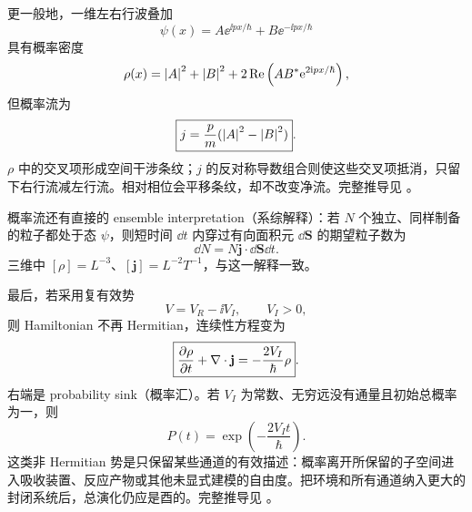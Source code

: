 
更一般地，一维左右行波叠加
\begin{equation}
  \psi(x)=A\ee^{\ii px/\hbar}+B\ee^{-\ii px/\hbar}
  \label{eq:QM-C05-S03-counterpropagating-state}
\end{equation}
具有概率密度
\begin{equation}
  \rho(x)=\left|A\right|^2+\left|B\right|^2
  +2\operatorname{Re}
  \left(AB^*\mathrm{e}^{2\mathrm{i} px/\hbar}\right),
  \label{eq:QM-C05-S03-counterpropagating-density}
\end{equation}
但概率流为
\begin{equation}
  \boxed{j=\frac{p}{m}(\left|A\right|^2-\left|B\right|^2)}.
  \label{eq:QM-C05-S03-counterpropagating-current}
\end{equation}
$\rho$ 中的交叉项形成空间干涉条纹；$j$ 的反对称导数组合则使这些交叉项抵消，只留下右行流减左行流。相对相位会平移条纹，却不改变净流。完整推导见
。

概率流还有直接的 ensemble interpretation（系综解释）：若 $N$ 个独立、同样制备的粒子都处于态 $\psi$，则短时间 $\dd t$ 内穿过有向面积元 $\dd\mathbf S$ 的期望粒子数为
\begin{equation}
  \dd N=N\mathbf j\cdot\dd\mathbf S\dd t.
  \label{eq:QM-C05-S03-ensemble-flux}
\end{equation}
三维中 $[\rho]=L^{-3}$、$[\mathbf j]=L^{-2}T^{-1}$，与这一解释一致。

最后，若采用复有效势
\begin{equation}
  V=V_R-\ii V_I,
  \qquad V_I>0,
  \label{eq:QM-C05-S03-complex-potential}
\end{equation}
则 Hamiltonian 不再 Hermitian，连续性方程变为
\begin{equation}
  \boxed{
  \frac{\partial \rho}{\partial t}+\nabla\cdot\mathbf j
  =-\frac{2V_I}{\hbar}\rho}.
  \label{eq:QM-C05-S03-sink-continuity}
\end{equation}
右端是 probability sink（概率汇）。若 $V_I$ 为常数、无穷远没有通量且初始总概率为一，则
\begin{equation}
  P(t)=\exp\left(-\frac{2V_It}{\hbar}\right).
  \label{eq:QM-C05-S03-total-decay}
\end{equation}
这类非 Hermitian 势是只保留某些通道的有效描述：概率离开所保留的子空间进入吸收装置、反应产物或其他未显式建模的自由度。把环境和所有通道纳入更大的封闭系统后，总演化仍应是酉的。完整推导见
。

